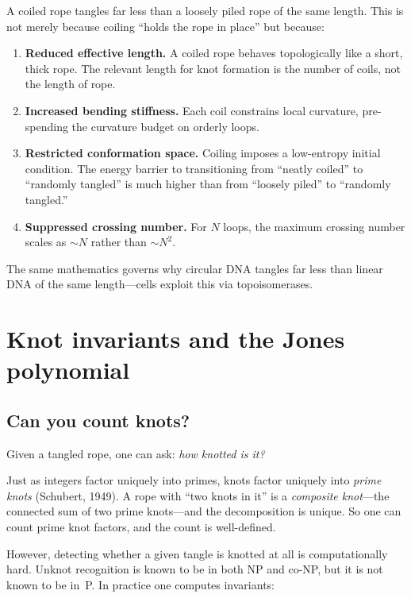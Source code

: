 \documentclass[12pt]{article}
\begin{document}
A coiled rope tangles far less than a loosely piled rope of the same length.
This is not merely because coiling ``holds the rope in place'' but because:
\begin{enumerate}
  \item \textbf{Reduced effective length.} A coiled rope behaves
    topologically like a short, thick rope. The relevant length for knot
    formation is the number of coils, not the length of rope.
  \item \textbf{Increased bending stiffness.} Each coil constrains local
    curvature, pre-spending the curvature budget on orderly loops.
  \item \textbf{Restricted conformation space.} Coiling imposes a
    low-entropy initial condition. The energy barrier to transitioning from
    ``neatly coiled'' to ``randomly tangled'' is much higher than from
    ``loosely piled'' to ``randomly tangled.''
  \item \textbf{Suppressed crossing number.} For $N$ loops, the maximum
    crossing number scales as $\sim N$ rather than $\sim N^2$.
\end{enumerate}
The same mathematics governs why circular DNA tangles far less than linear
DNA of the same length---cells exploit this via topoisomerases.

\section{Knot invariants and the Jones polynomial}

\subsection{Can you count knots?}

Given a tangled rope, one can ask: \emph{how knotted is it?}

Just as integers factor uniquely into primes, knots factor uniquely into
\emph{prime knots} (Schubert, 1949). A rope with ``two knots in it'' is a
\emph{composite knot}---the connected sum of two prime knots---and the
decomposition is unique. So one can count prime knot factors, and the count
is well-defined.

However, detecting whether a given tangle is knotted at all is
computationally hard. Unknot recognition is known to be in both NP and
co-NP, but it is not known to be in~P. In practice one computes invariants:
\end{document}
